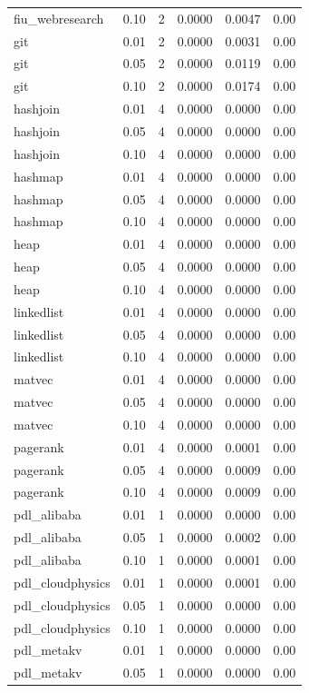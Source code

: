 \begin{tabular}{lcrrrr}
fiu\_webresearch & 0.10 & 2 & 0.0000 & 0.0047 & 0.00 \\
git & 0.01 & 2 & 0.0000 & 0.0031 & 0.00 \\
git & 0.05 & 2 & 0.0000 & 0.0119 & 0.00 \\
git & 0.10 & 2 & 0.0000 & 0.0174 & 0.00 \\
hashjoin & 0.01 & 4 & 0.0000 & 0.0000 & 0.00 \\
hashjoin & 0.05 & 4 & 0.0000 & 0.0000 & 0.00 \\
hashjoin & 0.10 & 4 & 0.0000 & 0.0000 & 0.00 \\
hashmap & 0.01 & 4 & 0.0000 & 0.0000 & 0.00 \\
hashmap & 0.05 & 4 & 0.0000 & 0.0000 & 0.00 \\
hashmap & 0.10 & 4 & 0.0000 & 0.0000 & 0.00 \\
heap & 0.01 & 4 & 0.0000 & 0.0000 & 0.00 \\
heap & 0.05 & 4 & 0.0000 & 0.0000 & 0.00 \\
heap & 0.10 & 4 & 0.0000 & 0.0000 & 0.00 \\
linkedlist & 0.01 & 4 & 0.0000 & 0.0000 & 0.00 \\
linkedlist & 0.05 & 4 & 0.0000 & 0.0000 & 0.00 \\
linkedlist & 0.10 & 4 & 0.0000 & 0.0000 & 0.00 \\
matvec & 0.01 & 4 & 0.0000 & 0.0000 & 0.00 \\
matvec & 0.05 & 4 & 0.0000 & 0.0000 & 0.00 \\
matvec & 0.10 & 4 & 0.0000 & 0.0000 & 0.00 \\
pagerank & 0.01 & 4 & 0.0000 & 0.0001 & 0.00 \\
pagerank & 0.05 & 4 & 0.0000 & 0.0009 & 0.00 \\
pagerank & 0.10 & 4 & 0.0000 & 0.0009 & 0.00 \\
pdl\_alibaba & 0.01 & 1 & 0.0000 & 0.0000 & 0.00 \\
pdl\_alibaba & 0.05 & 1 & 0.0000 & 0.0002 & 0.00 \\
pdl\_alibaba & 0.10 & 1 & 0.0000 & 0.0001 & 0.00 \\
pdl\_cloudphysics & 0.01 & 1 & 0.0000 & 0.0001 & 0.00 \\
pdl\_cloudphysics & 0.05 & 1 & 0.0000 & 0.0000 & 0.00 \\
pdl\_cloudphysics & 0.10 & 1 & 0.0000 & 0.0000 & 0.00 \\
pdl\_metakv & 0.01 & 1 & 0.0000 & 0.0000 & 0.00 \\
pdl\_metakv & 0.05 & 1 & 0.0000 & 0.0000 & 0.00 \\

\end{tabular}
